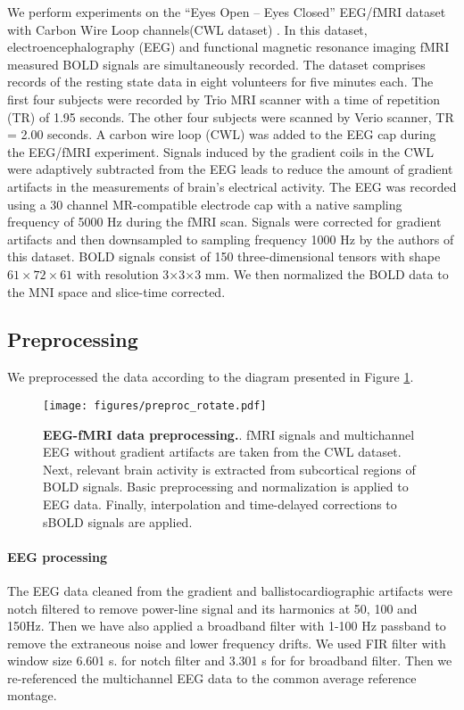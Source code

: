 \documentclass{article}
\begin{document}
We perform experiments on the “Eyes Open – Eyes Closed” EEG/fMRI dataset with Carbon Wire Loop channels(CWL dataset) \cite{cwl_data}. In this dataset, electroencephalography (EEG) and functional magnetic resonance imaging fMRI measured BOLD signals are simultaneously recorded. The dataset comprises records of the resting state data in eight volunteers for five minutes each. The first four subjects were recorded by Trio MRI scanner with a time of repetition (TR) of 1.95 seconds. The other four subjects were scanned by Verio scanner, TR = 2.00 seconds. A carbon wire loop (CWL) was added to the EEG cap during the EEG/fMRI experiment. Signals induced by the gradient coils in the CWL were adaptively subtracted from the EEG leads to reduce the amount of gradient artifacts in the measurements of brain's electrical activity. The EEG was recorded using a 30 channel MR-compatible electrode cap with a native sampling frequency of 5000 Hz during the fMRI scan. Signals were corrected for gradient artifacts and then downsampled to sampling frequency 1000 Hz by the authors of this dataset. BOLD signals consist of 150 three-dimensional tensors with shape $61\times72\times61$ with resolution 3×3×3 mm. We then normalized the BOLD data to the MNI space and slice-time corrected. 









\subsection{Preprocessing}
We preprocessed the data according  to the diagram presented in Figure \ref{fig:preproc}.
\begin{figure}[ht]
    \centering
    \texttt{[image: figures/preproc\_rotate.pdf]}
    \caption{\label{fig:preproc} \textbf{EEG-fMRI data preprocessing.}. fMRI signals and multichannel EEG without gradient artifacts are taken from the CWL dataset. Next, relevant brain activity is extracted from subcortical regions of BOLD signals. Basic preprocessing and normalization is applied to EEG data. Finally, interpolation and time-delayed corrections to sBOLD signals are applied.}
\end{figure}

\paragraph{EEG processing}
The EEG data cleaned from the gradient and ballistocardiographic artifacts were notch filtered to remove power-line signal and its harmonics at 50, 100 and 150Hz. Then we have also applied a broadband filter with 1-100 Hz passband to remove the extraneous noise and lower frequency drifts. We used FIR filter with window size 6.601 s. for notch filter and 3.301 s for  for broadband filter. Then we re-referenced the multichannel EEG data to the common average reference montage. 
\end{document}
